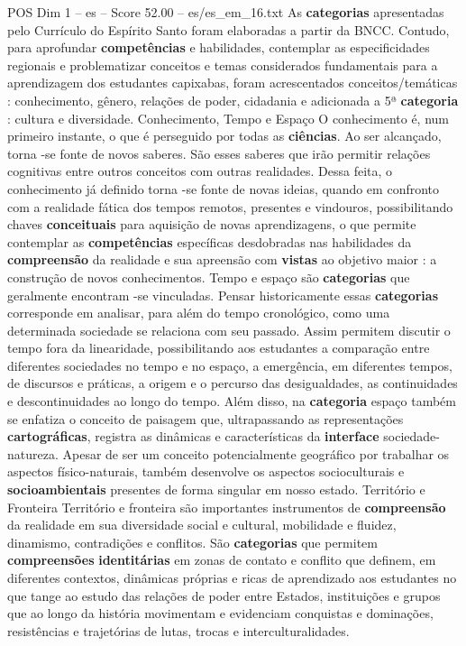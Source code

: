 \begin{textsample}{POS Dim 1 – es – Score 52.00 – es/es\_em\_16.txt}
As \textbf{categorias} apresentadas pelo Currículo do Espírito Santo foram elaboradas a partir da BNCC.
Contudo, para aprofundar \textbf{competências} e habilidades, contemplar as especificidades regionais e problematizar conceitos e temas considerados fundamentais para a aprendizagem dos estudantes capixabas, foram acrescentados conceitos/temáticas : conhecimento, gênero, relações de poder, cidadania e adicionada a 5ª \textbf{categoria} : cultura e diversidade.
Conhecimento, Tempo e Espaço O conhecimento é, num primeiro instante, o que é perseguido por todas as \textbf{ciências}.
Ao ser alcançado, torna -se fonte de novos saberes.
São esses saberes que irão permitir relações cognitivas entre outros conceitos com outras realidades.
Dessa feita, o conhecimento já definido torna -se fonte de novas ideias, quando em confronto com a realidade fática dos tempos remotos, presentes e vindouros, possibilitando chaves \textbf{conceituais} para aquisição de novas aprendizagens, o que permite contemplar as \textbf{competências} específicas desdobradas nas habilidades da \textbf{compreensão} da realidade e sua apreensão com \textbf{vistas} ao objetivo maior : a construção de novos conhecimentos.
Tempo e espaço são \textbf{categorias} que geralmente encontram -se vinculadas.
Pensar historicamente essas \textbf{categorias} corresponde em analisar, para além do tempo cronológico, como uma determinada sociedade se relaciona com seu passado.
Assim permitem discutir o tempo fora da linearidade, possibilitando aos estudantes a comparação entre diferentes sociedades no tempo e no espaço, a emergência, em diferentes tempos, de discursos e práticas, a origem e o percurso das desigualdades, as continuidades e descontinuidades ao longo do tempo.
Além disso, na \textbf{categoria} espaço também se enfatiza o conceito de paisagem que, ultrapassando as representações \textbf{cartográficas}, registra as dinâmicas e características da \textbf{interface} sociedade-natureza.
Apesar de ser um conceito potencialmente geográfico por trabalhar os aspectos físico-naturais, também desenvolve os aspectos socioculturais e \textbf{socioambientais} presentes de forma singular em nosso estado.
Território e Fronteira Território e fronteira são importantes instrumentos de \textbf{compreensão} da realidade em sua diversidade social e cultural, mobilidade e fluidez, dinamismo, contradições e conflitos.
São \textbf{categorias} que permitem \textbf{compreensões} \textbf{identitárias} em zonas de contato e conflito que definem, em diferentes contextos, dinâmicas próprias e ricas de aprendizado aos estudantes no que tange ao estudo das relações de poder entre Estados, instituições e grupos que ao longo da história movimentam e evidenciam conquistas e dominações, resistências e trajetórias de lutas, trocas e interculturalidades.

\end{textsample}
